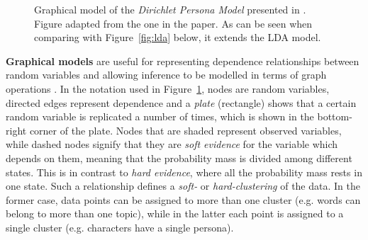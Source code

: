 \documentclass[bsc,frontabs,deptreport,singlespacing,parskip, twoside]{infthesis}
\begin{document}
\begin{figure}[ht!]
\centering
{}
\caption{Graphical model of the \textit{Dirichlet Persona Model} presented in \cite{Bamman2013}. Figure adapted from the one in the paper. As can be seen when comparing with Figure~\ref{fig:lda} below, it extends the LDA model.}
\label{fig:dirichlet_persona}
\end{figure}

\textbf{Graphical models} are useful for representing dependence relationships between random variables and allowing inference to be modelled in terms of graph operations \cite{barber2012bayesian}. In the notation used in Figure~\ref{fig:dirichlet_persona}, nodes are random variables, directed edges represent dependence and a \textit{plate} (rectangle) shows that a certain random variable is replicated a number of times, which is shown in the bottom-right corner of the plate. Nodes that are shaded represent observed variables, while dashed nodes signify that they are \textit{soft evidence} for the variable which depends on them, meaning that the probability mass is divided among different states. This is in contrast to \textit{hard evidence}, where all the probability mass rests in one state. Such a relationship defines a \textit{soft-} or \textit{hard-clustering} of the data. In the former case, data points can be assigned to more than one cluster (e.g. words can belong to more than one topic), while in the latter each point is assigned to a single cluster (e.g. characters have a single persona).
\end{document}
